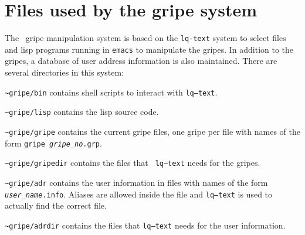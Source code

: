 \section{Files used by the gripe system}

The \AIPS\ gripe manipulation system is based on the {\tt lq-text}
system to select files and lisp programs running in {\tt emacs} to
manipulate the gripes.  In addition to the gripes, a database of user
address information is also maintained.  There are several directories
in this system:
\begin{description}
\item{{\tt \~{ }gripe/bin}} contains shell scripts to interact with
    {\tt lq--text}.
\item{{\tt \~{ }gripe/lisp}} contains the lisp source code.
\item{{\tt \~{ }gripe/gripe}} contains the current gripe files, one
    gripe per file with names of the form {\tt gripe{\it
    gripe\_no}.grp}.
\item{{\tt \~{ }gripe/gripedir}} contains the files that {\tt
    lq--text} needs for the gripes.
\item{{\tt \~{ }gripe/adr}} contains the user information in files
    with names of the form {\tt {\it user\_name}.info}.  Aliases are
    allowed inside the file and {\tt lq--text} is used to actually
    find the correct file.
\item{{\tt \~{ }gripe/adrdir}} contains the files that {\tt lq--text}
    needs for the user information.
\end{description}

